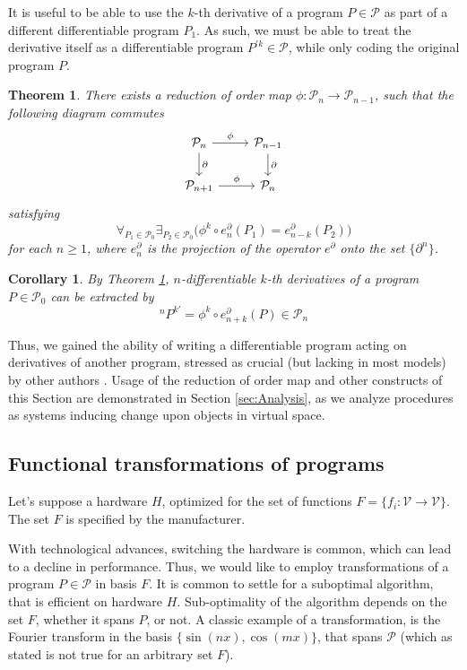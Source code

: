\documentclass[preprint,12pt]{elsarticle}
\newcommand{\VV}{\mathcal{V}}
\newcommand{\dP}{\mathcal{P}}
\newcommand{\D}{\partial}
\newtheorem{izrek}{Theorem}[section]
\newtheorem{corollary}{Corollary}[section]
\begin{document}
 It is useful to be able to use the $k$-th derivative of a program $P\in\dP$ as part of a different differentiable program $P_1$. As such, we must be able to treat the derivative itself as a differentiable program $P^{\prime k}\in\dP$, while only coding the original program $P$. 
\begin{izrek}\label{izr:reductionMap}
There exists a reduction of order map $\phi:\dP_n\to \dP_{n-1}$, such that the
following  diagram commutes
\begin{equation}\label{eq:reductionMap}
\begin{tikzcd}
  \dP_n \arrow{r}{\phi} \arrow{d}{\D} & 
  \dP_{n-1} \arrow{d}{\D}\\
  \dP_{n+1} \arrow{r}{\phi} & 
  \dP_{n}
\end{tikzcd}
\end{equation}
satisfying
\begin{equation}
\forall_{P_1\in\dP_0}\exists_{P_2\in\dP_0}\Big(\phi^k\circ e^\D_n(P_1)=e^\D_{n-k}(P_2)\Big)
\end{equation}
for each $n\ge 1$, where $e^\D_n$ is the projection of the operator $e^\D$ onto the set $\{\D^n\}$.
\end{izrek}  
\begin{corollary}\label{cor:extraxtDerivatives}
By Theorem \ref{izr:reductionMap}, $n$-differentiable $k$-th derivatives of a program $P\in\dP_0$ can be extracted by
\begin{equation}
^{n}P^{k\prime}=\phi^k\circ e^\D_{n+k}(P)\in\dP_n
\end{equation}
\end{corollary}    
 Thus, we gained the ability of writing a differentiable program acting on derivatives of another program, stressed as crucial (but lacking in most models) by other authors \cite{AD1}. Usage of the reduction of order map and other constructs of this Section are demonstrated in Section \ref{sec:Analysis}, as we analyze procedures as systems inducing change upon objects in virtual space.
 
   \subsection{Functional transformations of programs}\label{sec:FTP}
   
   Let's suppose a hardware $H$, optimized for the set of functions
   $F=\{f_i:\VV\to \VV\}$. The set $F$ is specified by the manufacturer.  
   
   With technological advances, switching the hardware is common, which can lead
   to a decline in performance.  Thus, we would like to employ transformations
   of a program $P\in\dP$ in basis $F$. It is common to settle for a suboptimal
   algorithm, that is efficient on hardware $H$. Sub-optimality of the algorithm
   depends on the set $F$, whether it spans $P$, or not. A classic example of a
   transformation, is the Fourier transform in the basis $\{\sin(nx),
   \cos(mx)\}$, that spans $\dP$ (which as stated is not true for an arbitrary
   set $F$).
   
\end{document}
